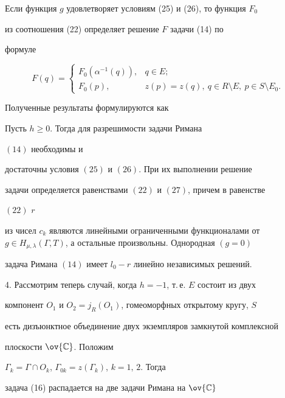 Если функция $g$ удовлетворяет условиям (25) и (26), то функция $F_0$


из соотношения (22) определяет решение $F$ задачи (14) по


формуле


\begin{equation}


F(q)=\begin{cases}


F_0(\alpha^{-1}(q)), & q\in E;\\


F_0(p), & z(p)=z(q),\ q\in R\setminus E,\ p\in S\setminus E_0.


\end{cases}


\end{equation}


Полученные результаты формулируются как





\begin{thm}


Пусть $h\ge 0$. Тогда для разрешимости задачи Римана


$(14)$ необходимы и


достаточны условия $(25)$ и $(26)$. При их выполнении решение


задачи определяется равенствами $(22)$ и $(27)$, причем в равенстве


$(22)$\; $r$


из чисел $c_k$ являются линейными ограниченными функционалами от $g\in


H_{\mu,\lambda}(\Gamma,T)$, а остальные произвольны. Однородная $(g=0)$


задача Римана $(14)$ имеет $l_0-r$ линейно независимых решений.


\end{thm}





4. Рассмотрим теперь случай, когда $h=-1$, т.\,е. $E$ состоит из двух


компонент $O_1$ и $O_2=j_R(O_1)$, гомеоморфных открытому кругу, $S$


есть дизъюнктное объединение двух экземпляров замкнутой комплексной


плоскости $\ov{\Bbb C}$. Положим


$\Gamma_k=\Gamma\cap O_k$, $\Gamma_{0k}=z(\Gamma_k)$, $k=1,\,2$. Тогда


задача (16) распадается на две задачи Римана на $\ov{\Bbb C}$


